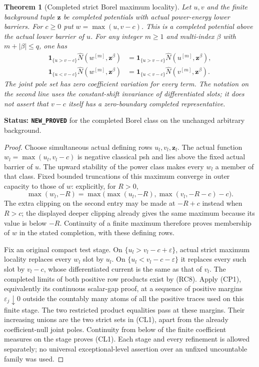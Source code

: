 \documentclass[11pt,a4paper]{article}
\numberwithin{equation}{section}
\newtheorem{theorem}{Theorem}[section]
\theoremstyle{definition}
\theoremstyle{remark}
\begin{document}
\begin{theorem}[Completed strict Borel maximum locality]
\label{thm:r11-completed-strict-maximum-locality}
Let $u,v$ and the finite background tuple $\mathbf z$ be completed
potentials with actual power-energy lower barriers. For $c\geq0$
put $w=\max(u,v-c)$. This is a completed potential above the
actual lower barrier of $u$. For any integer $m\geq1$ and
multi-index $\beta$ with $m+|\beta|\leq q$, one has
\[
 \begin{split}
 \mathbf1_{\{u>v-c\}}
       \widehat N(w^{[m]},\mathbf z^\beta)
   &=\mathbf1_{\{u>v-c\}}
       \widehat N(u^{[m]},\mathbf z^\beta),\\
 \mathbf1_{\{u<v-c\}}
       \widehat N(w^{[m]},\mathbf z^\beta)
   &=\mathbf1_{\{u<v-c\}}
       \widehat N(v^{[m]},\mathbf z^\beta).
 \end{split}
 \tag{CL1}
\]
The joint pole set has zero coefficient variation for every
term. The notation on the second line uses the constant-shift
invariance of differentiated slots; it does not assert that
$v-c$ itself has a zero-boundary completed representative.
\end{theorem}

\noindent\textbf{Status: \texttt{NEW\_PROVED}} for the completed
Borel class on the unchanged arbitrary background.

\begin{proof}
Choose simultaneous actual defining rows $u_l,v_l,\mathbf z_l$.
The actual function $w_l=\max(u_l,v_l-c)$ is negative classical
psh and lies above the fixed actual barrier of $u$. The upward
stability of the power class makes every $w_l$ a member of that
class. Fixed bounded truncations of this maximum converge in
outer capacity to those of $w$: explicitly, for $R>0$,
\[
       \max(w_l,-R)
          =\max\bigl(\max(u_l,-R),\max(v_l,-R-c)-c\bigr).
 \tag{CL2}
\]
The extra clipping on the second entry may be made at $-R+c$
instead when $R>c$; the displayed deeper clipping already
gives the same maximum because its value is below $-R$.
Continuity of a finite maximum therefore proves membership of
$w$ in the stated completion, with these defining rows.

Fix an original compact test stage. On
$\{u_l>v_l-c+\varepsilon\}$, actual strict maximum locality
replaces every $w_l$ slot by $u_l$. On
$\{u_l<v_l-c-\varepsilon\}$ it replaces every such slot by
$v_l-c$, whose differentiated current is the same as that of
$v_l$. The completed limits of both positive row products
exist by (RC8). Apply (CP1), equivalently its continuous
scalar-gap proof, at a sequence of positive margins
$\varepsilon_j\downarrow0$ outside the countably many
atoms of all the positive traces used on this finite stage.
The two restricted product equalities pass at these margins.
Their increasing unions are the two strict sets in (CL1),
apart from the already coefficient-null joint poles.
Continuity from below of the finite coefficient measures on
the stage proves (CL1). Each stage and every refinement is
allowed separately; no universal exceptional-level assertion
over an unfixed uncountable family was used.
\end{proof}
\end{document}
